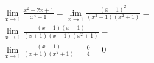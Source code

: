 \begin{ex}
\begin{align}
&\lim_{x\rightarrow 1} \frac{x^2-2x+1}{x^4-1}=\lim_{x\rightarrow 1} \frac{(x-1)^2}{(x^2-1)(x^2+1)}=\nonumber\\
&\lim_{x\rightarrow 1} \frac{(x-1)(x-1)}{(x+1)(x-1)(x^2+1)}=\nonumber\\
&\lim_{x\rightarrow 1} \frac{(x-1)}{(x+1)(x^2+1)}=\frac{0}{4}=0\nonumber
\end{align}
\end{ex}